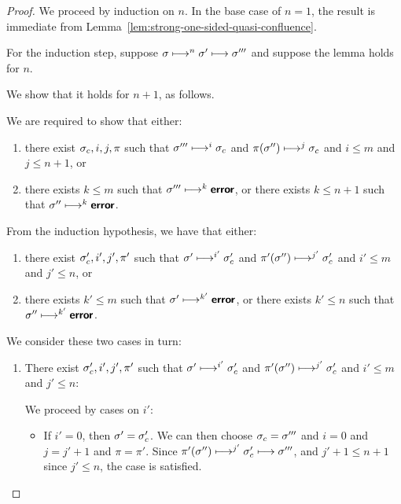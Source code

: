 \begin{proof}
  We proceed by induction on $n$.  In the base case of $n = 1$, the
  result is immediate from
  Lemma~\ref{lem:strong-one-sided-quasi-confluence}.

  For the induction step, suppose $\sigma \longmapsto^n \sigma'
  \longmapsto \sigma'''$ and suppose the lemma holds for $n$.

  We show that it holds for $n + 1$, as follows.

  We are required to show that either:
  \begin{enumerate}
  \item there exist $\sigma_c, i, j, \pi$ such that $\sigma'''
    \longmapsto^i \sigma_c$ and $\pi(\sigma'') \longmapsto^j \sigma_c$
    and $i \leq m$ and $j \leq n + 1$, or
  \item there exists $k \leq m$ such that $\sigma''' \longmapsto^k
    \textbf{\textsf{error}}$, or there exists $k \leq n + 1$ such that $\sigma''
    \longmapsto^k \textbf{\textsf{error}}$.
  \end{enumerate}

  From the induction hypothesis, we have that either:
  \begin{enumerate}
  \item there exist $\sigma'_c, i', j', \pi'$ such that $\sigma'
    \longmapsto^{i'} \sigma'_c$ and $\pi'(\sigma'') \longmapsto^{j'}
    \sigma'_c$ and $i' \leq m$ and $j' \leq n$, or
  \item there exists $k' \leq m$ such that $\sigma' \longmapsto^{k'}
    \textbf{\textsf{error}}$, or there exists $k' \leq n$ such that $\sigma''
    \longmapsto^{k'} \textbf{\textsf{error}}$.
  \end{enumerate}

  We consider these two cases in turn:

  \begin{enumerate}
  \item There exist $\sigma'_c, i', j', \pi'$ such that $\sigma'
    \longmapsto^{i'} \sigma'_c$ and $\pi'(\sigma'') \longmapsto^{j'}
    \sigma'_c$ and $i' \leq m$ and $j' \leq n$:

    We proceed by cases on $i'$:
    \begin{itemize}

    \item If $i' = 0$, then $\sigma' = \sigma_c'$.  We can then choose
      $\sigma_c = \sigma'''$ and $i = 0$ and $j = j' + 1$ and $\pi =
      \pi'$.  Since $\pi'(\sigma'') \longmapsto^{j'} \sigma'_c
      \longmapsto \sigma'''$, and $j' + 1 \leq n + 1$ since $j' \leq
      n$, the case is satisfied.


\end{itemize}
\end{enumerate}
\end{proof}
